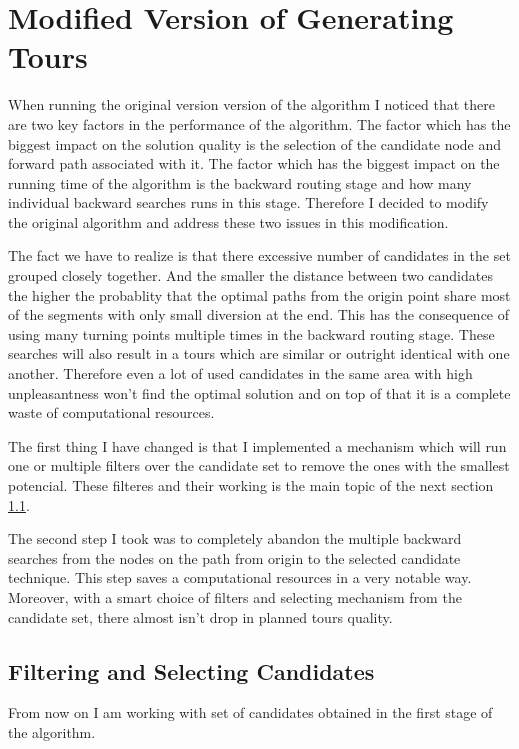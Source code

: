 \documentclass{ctuthesis}
\begin{document}
\section{Modified Version of Generating Tours} \label{sec:modification}
When running the original version version of the algorithm I noticed that there are two key factors in the performance of the algorithm. The factor which has the biggest impact on the solution quality is the selection of the candidate node and forward path associated with it. The factor which has the biggest impact on the running time of the algorithm is the backward routing stage and how many individual backward searches runs in this stage. Therefore I decided to modify the original algorithm and address these two issues in this modification.\par
The fact we have to realize is that there excessive number of candidates in the set grouped closely together. And the smaller the distance between two candidates the higher the probablity that the optimal paths from the origin point share most of the segments with only small diversion at the end. This has the consequence of using many turning points multiple times in the backward routing stage. These searches will also result in a tours which are similar or outright identical with one another. Therefore even a lot of used candidates in the same area with high unpleasantness won't find the optimal solution and on top of that it is a complete waste of computational resources.  \par
The first thing I have changed is that I implemented a mechanism which will run one or multiple filters over the candidate set to remove the ones with the smallest potencial. These filteres and their working is the main topic of the next section \ref{sec:filter}. \par
The second step I took was to completely abandon the multiple backward searches from the nodes on the path from origin to the selected candidate technique. This step saves a computational resources in a very notable way. Moreover, with a smart choice of filters and selecting mechanism from the candidate set, there almost isn't drop in planned tours quality. 


\subsection{Filtering and Selecting Candidates} \label{sec:filter}
From now on I am working with set of candidates obtained in the first stage of the algorithm. \par 
\end{document}

